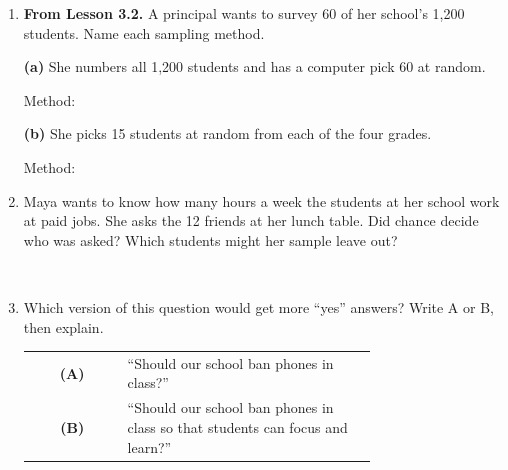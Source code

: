 \documentclass[12pt]{article}
\begin{document}

\vspace{0.28in}

\begin{enumerate}[leftmargin=1.9em, itemsep=0.42in]

  \item \textbf{From Lesson 3.2.} A principal wants to survey 60 of her school's 1{,}200
        students. Name each sampling method.

        \vspace{12pt}
        \textbf{(a)} She numbers all 1{,}200 students and has a computer pick 60 at random.

        \vspace{8pt}
        Method: 

        \vspace{12pt}
        \textbf{(b)} She picks 15 students at random from each of the four grades.

        \vspace{8pt}
        Method: 

  \item Maya wants to know how many hours a week the students at her school work at paid jobs.
        She asks the 12 friends at her lunch table. Did chance decide who was asked? Which
        students might her sample leave out?

        \vspace{12pt}
        \\[18pt]

  \item Which version of this question would get more ``yes'' answers? Write A or B, then
        explain.

        \vspace{10pt}
        \begin{center}
        \renewcommand{\arraystretch}{1.4}
        \begin{tabular}{@{} c p{0.72\linewidth} @{}}
        \textbf{(A)} & ``Should our school ban phones in class?'' \\
        \textbf{(B)} & ``Should our school ban phones in class so that students can focus and
                       learn?'' \\
        \end{tabular}
        \end{center}
        \vspace{6pt}
        \\[18pt]\\[18pt]\ansline{}

\end{enumerate}
\end{document}
